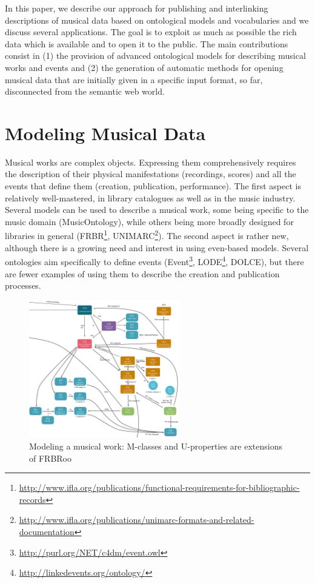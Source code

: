 \documentclass{llncs}
\begin{document}
In this paper, we describe our approach for publishing and interlinking descriptions of musical data based on ontological models and vocabularies and we discuss several applications. The goal is to exploit as much as possible the rich data which is available and to open it to the public. The main contributions consist in (1) the provision of advanced ontological models for describing musical works and events and (2) the generation of automatic methods for opening musical data that are initially given in a specific input format, so far, disconnected from the semantic web world.


\section{Modeling Musical Data}
\label{sec:modeling}
Musical works are complex objects. Expressing them comprehensively requires the description of their physical manifestations (recordings, scores) and all the events that define them (creation, publication, performance). The first aspect is relatively well-mastered, in library catalogues as well as in the music industry. Several models can be used to describe a musical work, some being specific to the music domain (MusicOntology), while others being more broadly designed for libraries in general (FRBR\footnote{\url{http://www.ifla.org/publications/functional-requirements-for-bibliographic-records}}, UNIMARC\footnote{\url{http://www.ifla.org/publications/unimarc-formats-and-related-documentation}}). The second aspect is rather new, although there is a growing need and interest in using even-based models. Several ontologies aim specifically to define events (Event\footnote{\url{http://purl.org/NET/c4dm/event.owl}}, LODE\footnote{\url{http://linkedevents.org/ontology/}}, DOLCE), but there are fewer examples of using them to describe the creation and publication processes.
\begin{figure}[htbp]
  \centering
  \includegraphics[height=6cm]{img/modelingdata_fig3.png}
  \caption{Modeling a musical work: M-classes and U-properties are extensions of FRBRoo}
  \label{fig:work}
\end{figure}
\end{document}
